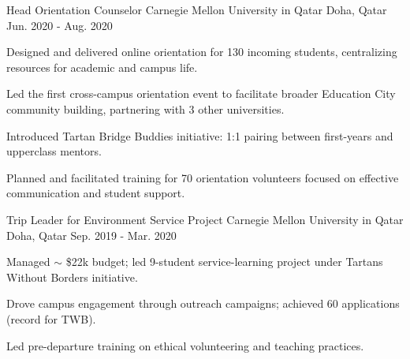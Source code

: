 

\begin{cventries}

  \cventry
    {Head Orientation Counselor} %
    {Carnegie Mellon University in Qatar} %
    {Doha, Qatar} %
    {Jun. 2020 - Aug. 2020} %
    {
      \begin{cvitems} %
        \item {Designed and delivered online orientation for 130 incoming students, centralizing resources for academic and campus life.}
        \item {Led the first cross-campus orientation event to facilitate broader Education City community building, partnering with 3 other universities.}
        \item {Introduced Tartan Bridge Buddies initiative: 1:1 pairing between first-years and upperclass mentors.}
        \item {Planned and facilitated training for 70 orientation volunteers focused on effective communication and student support.}
      \end{cvitems}
    }

  \cventry
    {Trip Leader for Environment Service Project} %
    {Carnegie Mellon University in Qatar} %
    {Doha, Qatar} %
    {Sep. 2019 - Mar. 2020} %
    {
      \begin{cvitems} %
        \item {Managed $\sim$ \$22k budget; led 9-student service-learning project under Tartans Without Borders initiative.}
        \item {Drove campus engagement through outreach campaigns; achieved 60 applications (record for TWB).}
        \item {Led pre-departure training on ethical volunteering and teaching practices.}
      \end{cvitems}
    }


\end{cventries}
